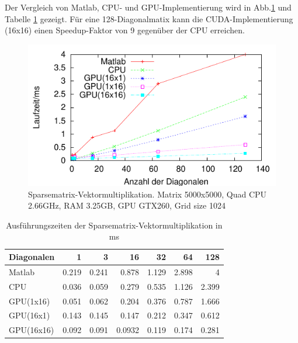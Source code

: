 


Der Vergleich von Matlab, CPU- und GPU-Implementierung wird in
Abb.\ref{sparse_ergebnis} und
Tabelle \ref{tab_sparse_result} gezeigt.
Für eine 128-Diagonalmatix kann die CUDA-Implementierung (16x16)
einen Speedup-Faktor von 9 gegenüber der CPU erreichen.


\begin{figure}[htbp]
\includegraphics{../ausarbeitung/sparse/sparsegp.pdf}
\caption{Sparsematrix-Vektormultiplikation. Matrix 5000x5000, Quad CPU 2.66GHz, RAM 3.25GB, GPU GTX260, Grid size 1024}
\label{sparse_ergebnis}
\end{figure}


\begin{table}
\renewcommand{\arraystretch}{1.3}
\caption{Ausführungszeiten der Sparsematrix-Vektormultiplikation in ms}
\label{tab_sparse_result}
\centering
\begin{tabular}{|l|r|r|r|r|r|r|}

\hline
Diagonalen& 1& 3& 16& 32& 64 &128\\


\hline
\hline
Matlab     &   0.219   &   0.241&   0.878  &  1.129 &  2.898  & 4\\
CPU        & 	0.036 &   0.059& 	0.279  &  0.535 &  1.126  & 2.399 \\
GPU(1x16)  & 0.051     &   0.062 &  0.204  &  0.376 &  0.787  & 1.666\\
GPU(16x1)  & 0.143     &	0.145 &	0.147  &  0.212 &	0.347 &	0.612\\

GPU(16x16)     & 0.092 &	0.091  &	0.0932 &	0.119&	0.174 &	0.281\\

\hline
\end{tabular}
\end{table}
